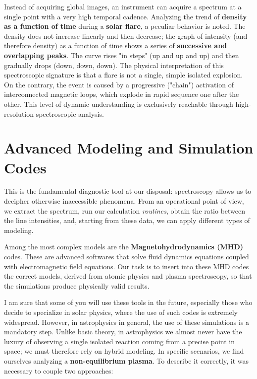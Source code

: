 Instead of acquiring global images, an instrument can acquire a spectrum at a single point with a very high temporal cadence. Analyzing the trend of \textbf{density as a function of time} during a \textbf{solar flare}, a peculiar behavior is noted.
The density does not increase linearly and then decrease; the graph of intensity (and therefore density) as a function of time shows a series of \textbf{successive and overlapping peaks}. The curve rises "in steps" (up and up and up) and then gradually drops (down, down, down).
The physical interpretation of this spectroscopic signature is that a flare is not a single, simple isolated explosion. On the contrary, the event is caused by a progressive ("chain") activation of interconnected magnetic loops, which explode in rapid sequence one after the other.
This level of dynamic understanding is exclusively reachable through high-resolution spectroscopic analysis.

\section{Advanced Modeling and Simulation Codes}

This is the fundamental diagnostic tool at our disposal: spectroscopy allows us to decipher otherwise inaccessible phenomena. From an operational point of view, we extract the spectrum, run our calculation \textit{routines}, obtain the ratio between the line intensities, and, starting from these data, we can apply different types of modeling.

Among the most complex models are the \textbf{Magnetohydrodynamics (MHD)} codes. These are advanced softwares that solve fluid dynamics equations coupled with electromagnetic field equations. Our task is to insert into these MHD codes the correct models, derived from atomic physics and plasma spectroscopy, so that the simulations produce physically valid results.

I am sure that some of you will use these tools in the future, especially those who decide to specialize in solar physics, where the use of such codes is extremely widespread. However, in astrophysics in general, the use of these simulations is a mandatory step.
Unlike basic theory, in astrophysics we almost never have the luxury of observing a single isolated reaction coming from a precise point in space; we must therefore rely on hybrid modeling. In specific scenarios, we find ourselves analyzing a \textbf{non-equilibrium plasma}. To describe it correctly, it was necessary to couple two approaches:

